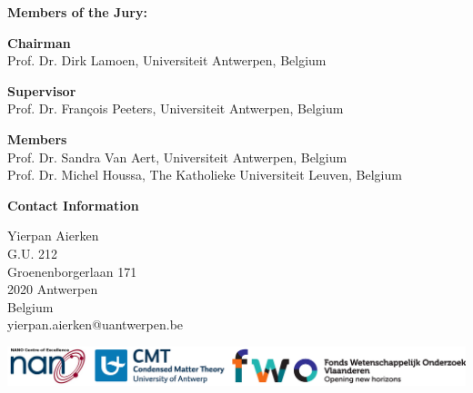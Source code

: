 \clearpage

\thispagestyle{empty}

\begin{list}{}{\leftmargin=0cm}

\item \textbf{Members of the Jury:}

\item \textbf{Chairman} \\
Prof. Dr. Dirk Lamoen, Universiteit Antwerpen, Belgium \\

\item \textbf{Supervisor} \\
Prof. Dr. Fran\c{c}ois Peeters, Universiteit Antwerpen, Belgium\\

\item \textbf{Members} \\
Prof. Dr. Sandra Van Aert, Universiteit Antwerpen, Belgium \\
Prof. Dr. Michel Houssa, The Katholieke Universiteit Leuven, Belgium \\
\end{list}

\vspace{2cm}
\noindent

\hfill
\begin{minipage}[b]{0.35\linewidth}
\begin{list}{}{\leftmargin=0cm}
            \item \textbf{Contact Information}
            \item    Yierpan Aierken \\
            G.U. 212 \\
            Groenenborgerlaan 171 \\
            2020 Antwerpen \\
            Belgium \\
            yierpan.aierken@uantwerpen.be

\end{list}

\end{minipage}
\vspace{2cm}
\begin{center}
\includegraphics[width =\textwidth]{Figs/Shields_all.eps}
\end{center}